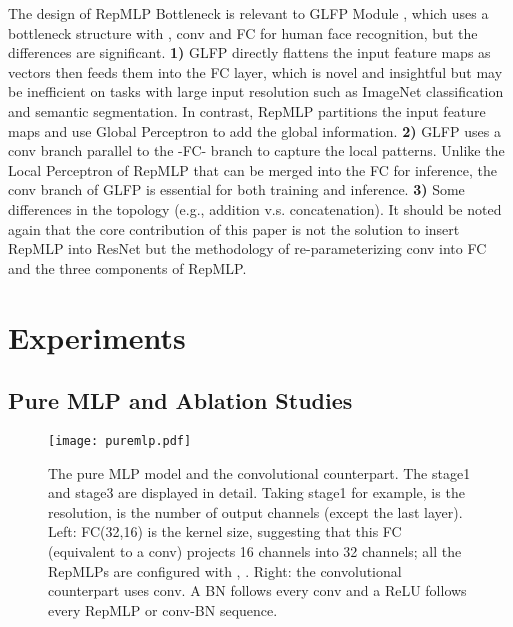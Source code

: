 \documentclass[10pt,twocolumn,letterpaper]{article}
\begin{document}
The design of RepMLP Bottleneck is relevant to GLFP Module \cite{xiapatent}, which uses a bottleneck structure with ,  conv and FC for human face recognition, but the differences are significant. \textbf{1)} GLFP directly flattens the input feature maps as vectors then feeds them into the FC layer, which is novel and insightful but may be inefficient on tasks with large input resolution such as ImageNet classification and semantic segmentation. In contrast, RepMLP partitions the input feature maps and use Global Perceptron to add the global information. \textbf{2)} GLFP uses a  conv branch parallel to the -FC- branch to capture the local patterns. Unlike the Local Perceptron of RepMLP that can be merged into the FC for inference, the conv branch of GLFP is essential for both training and inference. \textbf{3)} Some differences in the topology (e.g., addition v.s. concatenation). It should be noted again that the core contribution of this paper is not the solution to insert RepMLP into ResNet but the methodology of re-parameterizing conv into FC and the three components of RepMLP.



















\section{Experiments}

\subsection{Pure MLP and Ablation Studies}
\begin{figure}
	\begin{center}
		\texttt{[image: puremlp.pdf]}
		\vspace{-0.25in}
		\caption{The pure MLP model and the convolutional counterpart. The stage1 and stage3 are displayed in detail. Taking stage1 for example,  is the resolution,  is the number of output channels (except the last layer). Left: FC(32,16) is the kernel size, suggesting that this FC (equivalent to a  conv) projects 16 channels into 32 channels; all the RepMLPs are configured with , . Right: the convolutional counterpart uses  conv. A BN follows every conv and a ReLU follows every RepMLP or conv-BN sequence.}
		\label{fig-puremlp}
		\vspace{-0.25in}
	\end{center}
\end{figure}
\end{document}

